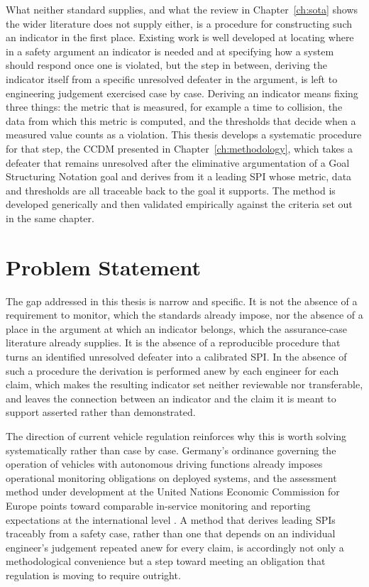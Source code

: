 What neither standard supplies, and what the review in Chapter~\ref{ch:sota} shows the
wider literature does not supply either, is a procedure for constructing such an
indicator in the first place. Existing work is well developed at locating where in a
safety argument an indicator is needed and at specifying how a system should respond
once one is violated, but the step in between, deriving the indicator itself from a
specific unresolved defeater in the argument, is left to engineering judgement exercised
case by case. Deriving an indicator means fixing three things: the metric that is
measured, for example a time to collision, the data from which this metric is computed,
and the thresholds that decide when a measured value counts as a violation. This thesis develops a systematic procedure for that
step, the \ac{CCDM} presented in Chapter~\ref{ch:methodology},
which takes a defeater that remains unresolved after the eliminative argumentation
of a Goal Structuring Notation goal and derives from it a leading \ac{SPI} whose
metric, data and thresholds are all traceable back to the goal it supports. The method is developed
generically and then validated empirically against the criteria set out in the same
chapter.

\section{Problem Statement}
\label{sec:intro_problem}

The gap addressed in this thesis is narrow and specific. It is not the
absence of a requirement to monitor, which the standards already impose, nor the
absence of a place in the argument at which an indicator belongs, which the
assurance-case literature already supplies. It is the absence of a reproducible
procedure that turns an identified unresolved defeater into a calibrated \ac{SPI}. In
the absence of such a procedure the derivation is performed anew by each engineer for
each claim, which makes the resulting indicator set neither reviewable nor
transferable, and leaves the connection between an indicator and the claim it is
meant to support asserted rather than demonstrated.

The direction of current vehicle regulation reinforces why this is worth solving
systematically rather than case by case. Germany's ordinance governing the operation of
vehicles with autonomous driving functions already imposes operational monitoring
obligations on deployed systems, and the assessment method under development at the
United Nations Economic Commission for Europe points toward comparable in-service
monitoring and reporting expectations at the international level \cite{afgbv2022,
natm2021}. A method that derives leading \acp{SPI} traceably from a safety case,
rather than one that depends on an individual engineer's judgement repeated anew for
every claim, is accordingly not only a methodological convenience but a step toward
meeting an obligation that regulation is moving to require outright.

